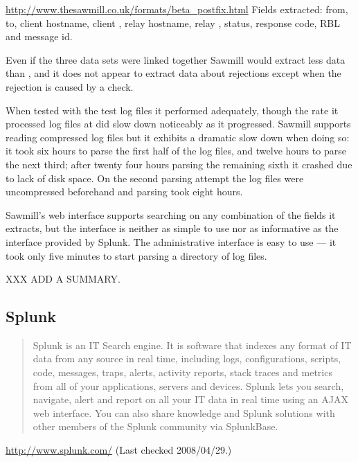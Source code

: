 \url{http://www.thesawmill.co.uk/formats/beta_postfix.html} \newline{} Fields
extracted: from, to, client hostname, client \IP{}, relay hostname, relay
\IP{}, status, response code, RBL and message id.

Even if the three data sets were linked together Sawmill would extract less
data than \parsername{}, and it does not appear to extract data about
rejections except when the rejection is caused by a \DNSBL{} check.

When tested with the \numberOFlogFILES{} test log files it performed
adequately, though the rate it processed log files at did slow down
noticeably as it progressed.  Sawmill supports reading compressed log files
but it exhibits a dramatic slow down when doing so: it took six hours to
parse the first half of the log files, and twelve hours to parse the next
third; after twenty four hours parsing the remaining sixth it crashed due
to lack of disk space.  On the second parsing attempt the log files were
uncompressed beforehand and parsing took eight hours.

Sawmill's web interface supports searching on any combination of the fields
it extracts, but the interface is neither as simple to use nor as
informative as the interface provided by Splunk.  The administrative
interface is easy to use --- it took only five minutes to start parsing a
directory of log files.

XXX ADD A SUMMARY\@.

\subsection{Splunk}

\begin{quotation}

    Splunk is an IT Search engine. It is software that indexes any format
    of IT data from any source in real time, including logs,
    configurations, scripts, code, messages, traps, alerts, activity
    reports, stack traces and metrics from all of your applications,
    servers and devices. Splunk lets you search, navigate, alert and report
    on all your IT data in real time using an AJAX web interface. You can
    also share knowledge and Splunk solutions with other members of the
    Splunk community via SplunkBase.

\end{quotation}

\noindent{}\url{http://www.splunk.com/} \newline{}
(Last checked 2008/04/29.)

